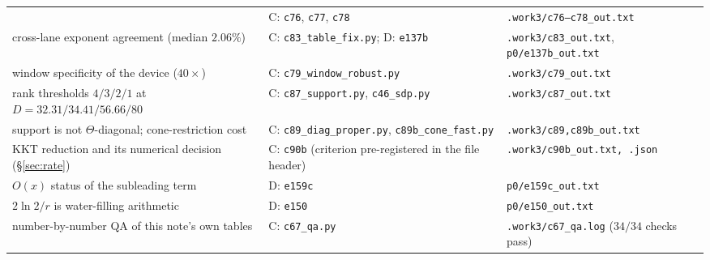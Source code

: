 \documentclass[journal]{IEEEtran}
\theoremstyle{remark}
\begin{document}
\begin{table}[t]
\begin{tabular}{@{}>{\raggedright\arraybackslash}p{5.2cm}>{\raggedright\arraybackslash}p{5.6cm}>{\raggedright\arraybackslash}p{5.8cm}@{}}
  & C: \texttt{c76}, \texttt{c77}, \texttt{c78}
  & \texttt{.work3/c76--c78\_out.txt} \\
cross-lane exponent agreement (median $2.06\%$)
  & C: \texttt{c83\_table\_fix.py}; D: \texttt{e137b}
  & \texttt{.work3/c83\_out.txt}, \texttt{p0/e137b\_out.txt} \\
window specificity of the device ($40\times$)
  & C: \texttt{c79\_window\_robust.py}
  & \texttt{.work3/c79\_out.txt} \\
rank thresholds $4/3/2/1$ at $D=32.31/34.41/56.66/80$
  & C: \texttt{c87\_support.py}, \texttt{c46\_sdp.py}
  & \texttt{.work3/c87\_out.txt} \\
support is not $\Theta$-diagonal; cone-restriction cost
  & C: \texttt{c89\_diag\_proper.py}, \texttt{c89b\_cone\_fast.py}
  & \texttt{.work3/c89,c89b\_out.txt} \\
KKT reduction and its numerical decision (\S\ref{sec:rate})
  & C: \texttt{c90b} (criterion pre-registered in the file header)
  & \texttt{.work3/c90b\_out.txt, .json} \\
$O(x)$ status of the subleading term
  & D: \texttt{e159c}
  & \texttt{p0/e159c\_out.txt} \\
$2\ln2/r$ is water-filling arithmetic
  & D: \texttt{e150}
  & \texttt{p0/e150\_out.txt} \\
number-by-number QA of this note's own tables
  & C: \texttt{c67\_qa.py}
  & \texttt{.work3/c67\_qa.log} ($34/34$ checks pass) \\
\bottomrule
\end{tabular}
\end{table}
\end{document}
